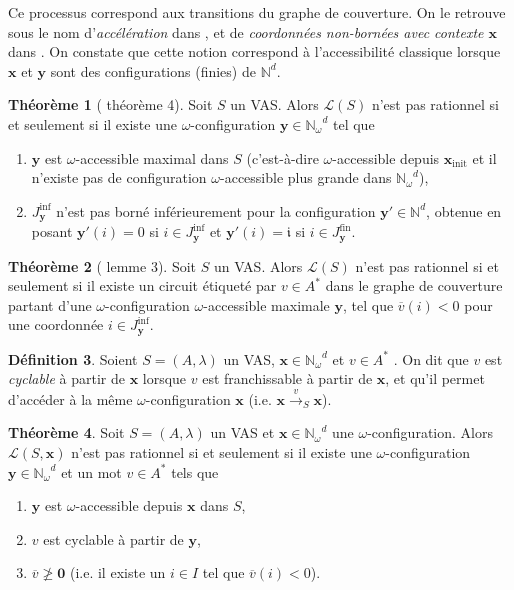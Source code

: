 \documentclass[a4paper,final]{article}
\theoremstyle{definition}
\newtheorem{Theorem}{Théorème}
\newtheorem{Definition}[Theorem]{Définition}
\let\geq\geqslant
\newcommand{\set}[2]{\left\{#1\mathrel{\left|\vphantom{#1}\vphantom{#2}\right.}#2\right\}}
\newcommand{\N}{\ensuremath{\mathbb{N}}}
\newcommand{\Nomega}{\ensuremath{\mathbb{N}_\omega}}
\newcommand{\lang}{\ensuremath{\mathcal{L}}}
\newcommand{\trans}[2]{\ensuremath{\stackrel{#1}{\longrightarrow}_{#2}}}
\newcommand{\vect}[1]{\ensuremath{\mathbf{#1}}}
\newcommand{\xinit}{\ensuremath{\vect{x}_\text{init}}}
\newcommand{\valeur}[1]{\ensuremath{\overline{#1}}}
\newcommand{\Jfin}[1]{J^\text{fin}_{#1}}
\newcommand{\Jinf}[1]{J^\text{inf}_{#1}}
\begin{document}
Ce processus correspond aux transitions du graphe de couverture.
On le retrouve sous le nom d'\emph{accélération} dans \cite{FHK-fossacs2020}, et de \emph{coordonnées non-bornées avec contexte \vect{x}} dans \cite{vavn81}.
On constate que cette notion correspond à l'accessibilité classique lorsque $\vect{x}$ et $\vect{y}$ sont des configurations (finies) de $\N^d$.


\begin{Theorem}[\cite{vavn81} théorème 4]
Soit $S$ un VAS.
Alors $\lang(S)$ n'est pas rationnel si et seulement si
il existe une $\omega$-configuration $\vect{y} \in \Nomega^d$ tel que
\begin{enumerate}
    \item $\vect{y}$ est $\omega$-accessible maximal dans $S$ (c'est-à-dire $\omega$-accessible depuis $\xinit$ et il n'existe pas de configuration $\omega$-accessible plus grande dans $\Nomega^d$),
    \item $\Jinf{\vect{y}}$ n'est pas borné inférieurement pour la configuration $\vect{y'}\in\N^d$, 
    obtenue en posant $\vect{y'}(i) = 0$ si $i\in \Jinf{\vect{y}}$ et $\vect{y'}(i) = \mathfrak{i}$ si $i\in \Jfin{\vect{y}}$.
\end{enumerate}
\end{Theorem}

\begin{Theorem}[\cite{vavn81} lemme 3]
Soit $S$ un VAS.
Alors $\lang(S)$ n'est pas rationnel si et seulement si
il existe un circuit étiqueté par $v\in A^*$ dans le graphe de couverture partant d'une $\omega$-configuration $\omega$-accessible maximale $\vect{y}$, 
tel que $\valeur{v}(i) < 0$ pour une coordonnée $i\in \Jinf{\vect{y}}$.
\end{Theorem}


\begin{Definition}
Soient $S = (A,\lambda)$ un VAS, $\vect{x}\in\Nomega^d$  et $v\in A^*$ .
On dit que $v$ est \emph{cyclable} à partir de $\vect{x}$ lorsque $v$ est franchissable à partir de $\vect{x}$, et qu'il permet d'accéder à la même $\omega$-configuration $\vect{x}$ (i.e. $\vect{x} \trans{v}{S} \vect{x}$).
\end{Definition}

\begin{Theorem}
Soit $S = (A,\lambda)$ un VAS et $\vect{x}\in\Nomega^d$ une $\omega$-configuration.
Alors $\lang(S,\vect{x})$ n'est pas rationnel si et seulement si
il existe une $\omega$-configuration $\vect{y}\in\Nomega^d$ et un mot $v\in A^*$ tels que
\begin{enumerate}
    \item $\vect{y}$ est $\omega$-accessible depuis $\vect{x}$ dans $S$,
    \item $v$ est cyclable à partir de $\vect{y}$,
    \item $\valeur{v} \not\geq \vect{0}$ (i.e. il existe un $i\in I$ tel que $\valeur{v}(i)<0$).
\end{enumerate}
\end{Theorem}
\end{document}
